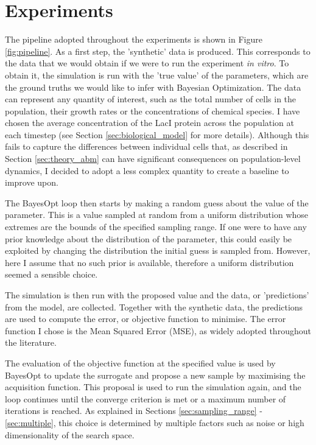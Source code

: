 \documentclass[bsc,frontabs,singlespacing,parskip,deptreport]{infthesis}
\begin{document}
\section{Experiments}\label{sec:experiments}
The pipeline adopted throughout the experiments is shown in Figure \ref{fig:pipeline}. As a first step, the 'synthetic' data is produced. This corresponds to the data that we would obtain if we were to run the experiment \textit{in vitro}. To obtain it, the simulation is run with the 'true value' of the parameters, which are the ground truths we would like to infer with Bayesian Optimization. The data can represent any quantity of interest, such as the total number of cells in the population, their growth rates or the concentrations of chemical species. I have chosen the average concentration of the LacI protein across the population at each timestep (see Section \ref{sec:biological_model} for more details). Although this fails to capture the differences between individual cells that, as described in Section \ref{sec:theory_abm} can have significant consequences on population-level dynamics, I decided to adopt a less complex quantity to create a baseline to improve upon.

The BayesOpt loop then starts by making a random guess about the value of the parameter. This is a value sampled at random from a uniform distribution whose extremes are the bounds of the specified sampling range. If one were to have any prior knowledge about the distribution of the parameter, this could easily be exploited by changing the distribution the initial guess is sampled from. However, here I assume that no such prior is available, therefore a uniform distribution seemed a sensible choice.

The simulation is then run with the proposed value and the data, or 'predictions' from the model, are collected. Together with the synthetic data, the predictions are used to compute the error, or objective function to minimise. The error function I chose is the Mean Squared Error (MSE), as widely adopted throughout the literature.

The evaluation of the objective function at the specified value is used by BayesOpt to update the surrogate and propose a new sample by maximising the acquisition function. This proposal is used to run the simulation again, and the loop continues until the converge criterion is met or a maximum number of iterations is reached. As explained in Sections \ref{sec:sampling_range} - \ref{sec:multiple}, this choice is determined by multiple factors such as noise or high dimensionality of the search space. 
\end{document}
